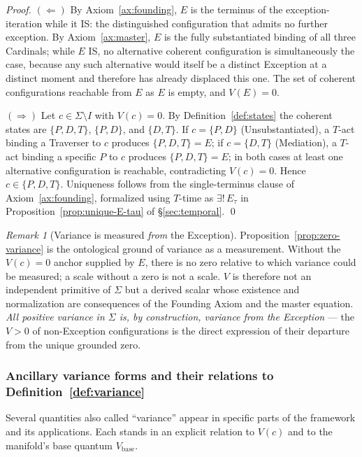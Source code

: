 \documentclass[11pt,a4paper]{article}
\theoremstyle{definition}
\theoremstyle{remark}
\newtheorem{remark}[theorem]{Remark}
\begin{document}
\begin{proof}
$(\Leftarrow)$ By Axiom~\ref{ax:founding}, $E$ is the terminus of the exception-iteration while it IS: the distinguished configuration that admits no further exception. By Axiom~\ref{ax:master}, $E$ is the fully substantiated binding of all three Cardinals; while $E$ IS, no alternative coherent configuration is simultaneously the case, because any such alternative would itself be a distinct Exception at a distinct moment and therefore has already displaced this one. The set of coherent configurations reachable from $E$ as $E$ is empty, and $V(E) = 0$.

$(\Rightarrow)$ Let $c \in \Sigma\setminus I$ with $V(c) = 0$. By Definition~\ref{def:states} the coherent states are $\{P,D,T\}$, $\{P,D\}$, and $\{D,T\}$. If $c = \{P,D\}$ (Unsubstantiated), a $T$-act binding a Traverser to $c$ produces $\{P,D,T\} = E$; if $c = \{D,T\}$ (Mediation), a $T$-act binding a specific $P$ to $c$ produces $\{P,D,T\} = E$; in both cases at least one alternative configuration is reachable, contradicting $V(c)=0$. Hence $c \in \{P,D,T\}$. Uniqueness follows from the single-terminus clause of Axiom~\ref{ax:founding}, formalized using $T$-time as $\exists!\,E_\tau$ in Proposition~\ref{prop:unique-E-tau} of \S\ref{sec:temporal}. \qed
\end{proof}

\begin{remark}[Variance is measured \emph{from} the Exception]\label{rem:variance-from-E}
Proposition~\ref{prop:zero-variance} is the ontological ground of variance as a measurement. Without the $V(c) = 0$ anchor supplied by $E$, there is no zero relative to which variance could be measured; a scale without a zero is not a scale. $V$ is therefore not an independent primitive of $\Sigma$ but a derived scalar whose existence and normalization are consequences of the Founding Axiom and the master equation. \emph{All positive variance in $\Sigma$ is, by construction, variance from the Exception} --- the $V>0$ of non-Exception configurations is the direct expression of their departure from the unique grounded zero.
\end{remark}

\subsubsection*{Ancillary variance forms and their relations to Definition~\ref{def:variance}}

Several quantities also called ``variance'' appear in specific parts of the framework and its applications. Each stands in an explicit relation to $V(c)$ and to the manifold's base quantum $V_{\text{base}}$.
\end{document}

